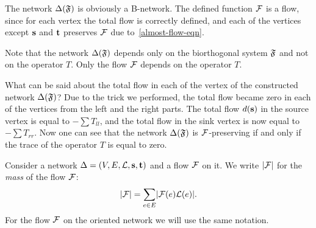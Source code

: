 \documentclass[12pt,oneside,a4paper]{amsart}
\begin{document}
      The network $\Delta(\mathfrak{F})$ is obviously a B-network.
      The defined function $\mathcal{F}$ is a flow, since for each vertex the total flow is correctly defined,
        and each of the vertices except $\mathbf{s}$ and $\mathbf{t}$ preserves $\mathcal{F}$ due to~\eqref{almost-flow-eqn}.
      \begin{remark}
        Note that the network $\Delta(\mathfrak{F})$ depends only on the biorthogonal system $\mathfrak{F}$ and not on the operator $T$.
        Only the flow $\mathcal{F}$ depends on the operator $T$.
      \end{remark}
      What can be said about the total flow in each of the vertex of the constructed network $\Delta(\mathfrak{F})$?
      Due to the trick we performed, the total flow became zero in each of the vertices from the left and the right parts.
      The total flow $d(\mathbf{s})$ in the source vertex is equal to $-\sum T_{ll}$, and the total flow in the
        sink vertex is now equal to $-\sum T_{rr}$.
      Now one can see that the network $\Delta(\mathfrak{F})$ is $\mathcal{F}$-preserving if and only if the trace of the operator $T$ is equal to zero.
      \begin{definition}
        Consider a network $\Delta = (V, E, \mathcal{L}, \mathbf{s}, \mathbf{t})$ and a flow $\mathcal{F}$ on it.
        We write $\lvert\mathcal{F}\rvert$ for the \emph{mass} of the flow $\mathcal{F}$:
        \[
          \lvert\mathcal{F}\rvert = \sum_{e \in E} \lvert\mathcal{F}(e) \mathcal{L}(e)\rvert.
        \]
        For the flow $\mathcal{F}$ on the oriented network we will use the same notation.
      \end{definition}
\end{document}
